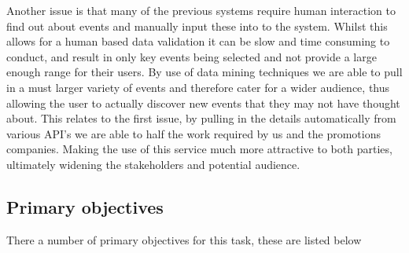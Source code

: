 	Another issue is that many of the previous systems require human interaction to find out about events and manually input these into to the system. Whilst this allows for a human based data validation it can be slow and time consuming to conduct, and result in only key events being selected and not provide a large enough range for their users. By use of data mining techniques we are able to pull in a must larger variety of events and therefore cater for a wider audience, thus allowing the user to actually discover new events that they may not have thought about. This relates to the first issue, by pulling in the details automatically from various API's we are able to half the work required by us and the promotions companies. Making the use of this service much more attractive to both parties, ultimately widening the stakeholders and potential audience. 		

	\subsection{Primary objectives}
		
		There a number of primary objectives for this task, these are listed below

